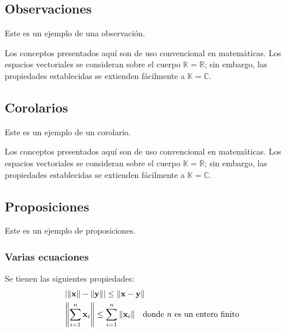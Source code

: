
\subsection{Observaciones}

Este es un ejemplo de una observación.

\begin{remark}
	Los conceptos presentados aquí son de uso convencional en matemáticas. Los espacios vectoriales se consideran sobre el cuerpo $\mathbb{K}=\mathbb{R}$; sin embargo, las propiedades establecidas se extienden fácilmente a $\mathbb{K}=\mathbb{C}$.
\end{remark}


\subsection{Corolarios}

Este es un ejemplo de un corolario.

\begin{corollary}
	Los conceptos presentados aquí son de uso convencional en matemáticas. Los espacios vectoriales se consideran sobre el cuerpo $\mathbb{K}=\mathbb{R}$; sin embargo, las propiedades establecidas se extienden fácilmente a $\mathbb{K}=\mathbb{C}$.
\end{corollary}


\subsection{Proposiciones}

Este es un ejemplo de proposiciones.

\subsubsection{Varias ecuaciones}

\begin{proposition}
	Se tienen las siguientes propiedades:
	\begin{align}
		& \abs{\norm{\mathbf{x}} - \norm{\mathbf{y}}} \leq \norm{ \mathbf{x}- \mathbf{y}}\\
		&  \norm{\sum_{i=1}^n\mathbf{x}_i} \leq \sum_{i=1}^n\norm{\mathbf{x}_i}\quad\text{donde $n$ es un entero finito}
	\end{align}
\end{proposition}

